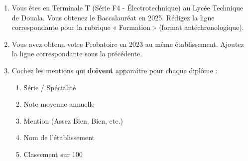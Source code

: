 \documentclass[11pt]{article}
\begin{document}
\begin{exercice}
\begin{enumerate}
    \item Vous êtes en Terminale T (Série F4 - Électrotechnique) au Lycée Technique de Douala. Vous obtenez le Baccalauréat en 2025. Rédigez la ligne correspondante pour la rubrique « Formation » (format antéchronologique).
    \item Vous avez obtenu votre Probatoire en 2023 au même établissement. Ajoutez la ligne correspondante sous la précédente.
    \item Cochez les mentions qui \textbf{doivent} apparaître pour chaque diplôme :
    \begin{enumerate}[label=\alph*)]
        \item Série / Spécialité
        \item Note moyenne annuelle
        \item Mention (Assez Bien, Bien, etc.)
        \item Nom de l'établissement
        \item Classement sur 100
    \end{enumerate}
\end{enumerate}
\end{exercice}
\end{document}
